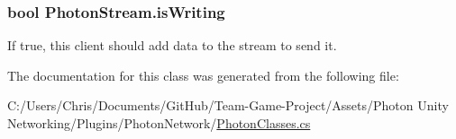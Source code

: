 \subsubsection[{\texorpdfstring{is\+Writing}{isWriting}}]{\setlength{\rightskip}{0pt plus 5cm}bool Photon\+Stream.\+is\+Writing\hspace{0.3cm}{\ttfamily [get]}}\hypertarget{class_photon_stream_a99e20ecd7737381042751acf8ec8fc4b}{}\label{class_photon_stream_a99e20ecd7737381042751acf8ec8fc4b}


If true, this client should add data to the stream to send it.



The documentation for this class was generated from the following file\+:\begin{DoxyCompactItemize}
\item 
C\+:/\+Users/\+Chris/\+Documents/\+Git\+Hub/\+Team-\/\+Game-\/\+Project/\+Assets/\+Photon Unity Networking/\+Plugins/\+Photon\+Network/\hyperlink{_photon_classes_8cs}{Photon\+Classes.\+cs}\end{DoxyCompactItemize}
